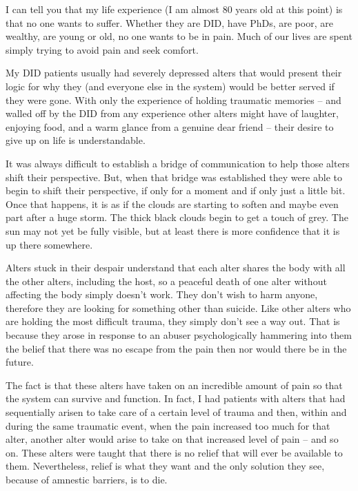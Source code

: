 \documentclass[]{book}
\begin{document}
I can tell you that my life experience (I am almost 80 years old at this point) is that no one wants to suffer. Whether they are DID, have PhDs, are poor, are wealthy, are young or old, no one wants to be in pain. Much of our lives are spent simply trying to avoid pain and seek comfort.

My DID patients usually had severely depressed alters that would present their logic for why they (and everyone else in the system) would be better served if they were gone. With only the experience of holding traumatic memories -- and walled off by the DID from any experience other alters might have of laughter, enjoying food, and a warm glance from a genuine dear friend -- their desire to give up on life is understandable.

It was always difficult to establish a bridge of communication to help those alters shift their perspective. But, when that bridge was established they were able to begin to shift their perspective, if only for a moment and if only just a little bit. Once that happens, it is as if the clouds are starting to soften and maybe even part after a huge storm. The thick black clouds begin to get a touch of grey. The sun may not yet be fully visible, but at least there is more confidence that it is up there somewhere.

Alters stuck in their despair understand that each alter shares the body with all the other alters, including the host, so a peaceful death of one alter without affecting the body simply doesn't work. They don't wish to harm anyone, therefore they are looking for something other than suicide. Like other alters who are holding the most difficult trauma, they simply don't see a way out. That is because they arose in response to an abuser psychologically hammering into them the belief that there was no escape from the pain then nor would there be in the future.

The fact is that these alters have taken on an incredible amount of pain so that the system can survive and function. In fact, I had patients with alters that had sequentially arisen to take care of a certain level of trauma and then, within and during the same traumatic event, when the pain increased too much for that alter, another alter would arise to take on that increased level of pain -- and so on. These alters were taught that there is no relief that will ever be available to them. Nevertheless, relief is what they want and the only solution they see, because of amnestic barriers, is to die.
\end{document}
